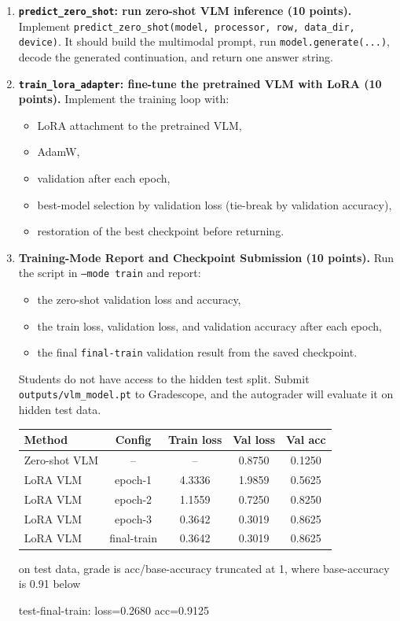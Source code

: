 \begin{Q}
\begin{enumerate}
\item \textbf{\texttt{predict\_zero\_shot}: run zero-shot VLM inference (10 points).}
Implement \texttt{predict\_zero\_shot(model, processor, row, data\_dir, device)}.
It should build the multimodal prompt, run \texttt{model.generate(...)}, decode the generated continuation, and return one answer string.

\item \textbf{\texttt{train\_lora\_adapter}: fine-tune the pretrained VLM with LoRA (10 points).}
Implement the training loop with:
\begin{itemize}
\item LoRA attachment to the pretrained VLM,
\item AdamW,
\item validation after each epoch,
\item best-model selection by validation loss (tie-break by validation accuracy),
\item restoration of the best checkpoint before returning.
\end{itemize}

\item \textbf{Training-Mode Report and Checkpoint Submission (10 points).}
Run the script in \texttt{--mode train} and report:
\begin{itemize}
\item the zero-shot validation loss and accuracy,
\item the train loss, validation loss, and validation accuracy after each epoch,
\item the final \texttt{final-train} validation result from the saved checkpoint.
\end{itemize}
Students do not have access to the hidden test split. Submit \texttt{outputs/vlm\_model.pt} to Gradescope, and the autograder will evaluate it on hidden test data.

\begin{solution}

  \begin{tabular}{lcccc}
\hline
Method & Config & Train loss & Val loss & Val acc \\
\hline
Zero-shot VLM & -- & -- & 0.8750 & 0.1250 \\
LoRA VLM & epoch-1 & 4.3336 & 1.9859 & 0.5625 \\
LoRA VLM & epoch-2 & 1.1559 & 0.7250 & 0.8250 \\
LoRA VLM & epoch-3 & 0.3642 & 0.3019 & 0.8625 \\
LoRA VLM & final-train & 0.3642 & 0.3019 & 0.8625 \\
\hline
\end{tabular}

on test data, grade is acc/base-accuracy truncated at 1, where base-accuracy is 0.91 below


test-final-train: loss=0.2680 acc=0.9125

\end{solution}

\end{enumerate}
\end{Q}
